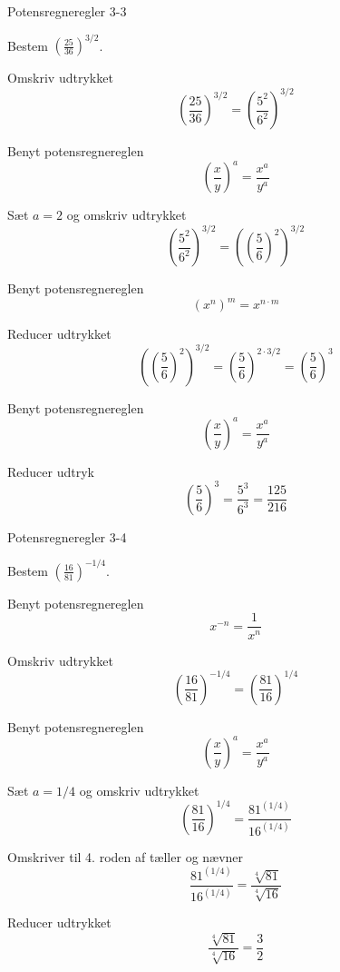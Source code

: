 \documentclass{article}
\begin{document}
\newpage

\begin{exercise}{Potensregneregler 3-3}

Bestem $\left(\frac{25}{36}\right)^{3/2}$.


\hint

Omskriv udtrykket
\[
\left(\frac{25}{36}\right)^{3/2}= \left(\frac{5^2}{6^2}\right)^{3/2}
\]

\hint

Benyt potensregnereglen
\[
\left(\frac{x}{y}\right)^a = \frac{x^a}{y^a}
\]

\hint

Sæt $a=2$ og omskriv udtrykket
\[
\left(\frac{5^2}{6^2}\right)^{3/2} = \left({\left(\frac{5}{6}\right)^2} \right)^{3/2}
\]

\hint

Benyt potensregnereglen
\[
(x^n)^m = x^{n \cdot m}
\]

\hint

Reducer udtrykket
\[
 \left({\left(\frac{5}{6}\right)^2} \right)^{3/2} = \left(\frac{5}{6}\right)^{2 \cdot 3/2} = \left(\frac{5}{6}\right)^{3}
\]

\hint

Benyt potensregnereglen
\[
\left(\frac{x}{y}\right)^a = \frac{x^a}{y^a}
\]

\hint

Reducer udtryk
\[
\left(\frac{5}{6}\right)^{3} = \frac{5^3}{6^3} = \frac{125}{216}
\]

\end{exercise}

\newpage

\begin{exercise}{Potensregneregler 3-4}

Bestem $\left(\frac{16}{81}\right)^{-1/4}$.


\hint

Benyt potensregnereglen
\[
x^{-n} = \frac{1}{x^n}
\]

\hint

Omskriv udtrykket
\[
\left(\frac{16}{81}\right)^{-1/4}= \left(\frac{81}{16}\right)^{1/4}
\]

\hint

Benyt potensregnereglen
\[
\left(\frac{x}{y}\right)^a = \frac{x^a}{y^a}
\]

\hint

Sæt $a=1/4$ og omskriv udtrykket
\[
\left(\frac{81}{16}\right)^{1/4} = \frac{81^{\left(1/4\right)}}{16^{\left(1/4\right)}}
\]

\hint

Omskriver til 4. roden af tæller og nævner
\[
\frac{81^{\left(1/4\right)}}{16^{\left(1/4\right)}} = \frac{\sqrt[4]{81}}{\sqrt[4]{16}}
\]

\hint

Reducer udtrykket
\[
\frac{\sqrt[4]{81}}{\sqrt[4]{16}} = \frac{3}{2}
\]


\end{exercise}
\end{document}
